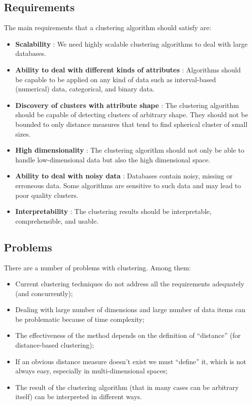 \subsection{Requirements}
The main requirements that a clustering algorithm should satisfy are:
\begin{itemize}
\item \textbf{Scalability} : We need highly scalable clustering algorithms to deal with large databases.
\item \textbf{Ability to deal with different kinds of attributes} : Algorithms should be capable to be applied on any kind of data such as interval-based (numerical) data, categorical, and binary data.
\item \textbf{Discovery of clusters with attribute shape} : The clustering algorithm should be capable of detecting clusters of arbitrary shape. They should not be bounded to only distance measures that tend to find spherical cluster of small sizes.
\item \textbf{High dimensionality} : The clustering algorithm should not only be able to handle low-dimensional data but also the high dimensional space.
\item \textbf{Ability to deal with noisy data} : Databases contain noisy, missing or erroneous data. Some algorithms are sensitive to such data and may lead to poor quality clusters.
\item \textbf{Interpretability} : The clustering results should be interpretable, comprehensible, and usable.
\end{itemize}

\subsection{Problems}
There are a number of problems with clustering. Among them:
\begin{itemize}
\item Current clustering techniques do not address all the requirements adequately (and concurrently);
\item Dealing with large number of dimensions and large number of data items can be problematic because of time complexity;
\item The effectiveness of the method depends on the definition of “distance” (for distance-based clustering);
\item If an obvious distance measure doesn’t exist we must “define” it, which is not always easy, especially in multi-dimensional spaces;
\item The result of the clustering algorithm (that in many cases can be arbitrary itself) can be interpreted in different ways.
\end{itemize}

